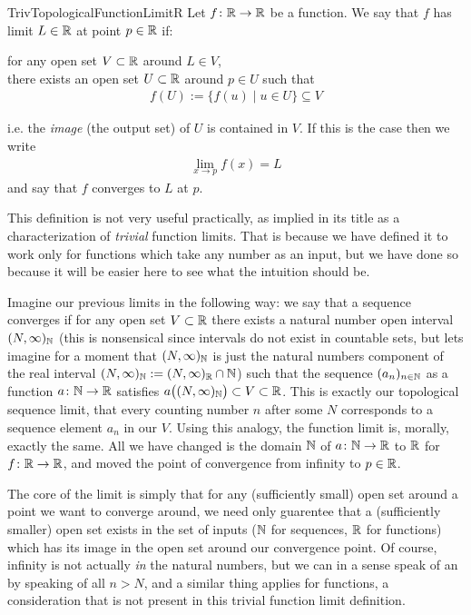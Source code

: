 \documentclass[11pt]{article}
\begin{document}
\begin{label definition}{TrivTopologicalFunctionLimitR}
Let $f\colon \mathbb{R} \to \mathbb{R}$ be a function. We say that $f$ has limit $L \in \mathbb{R}$ at point $p\in \mathbb{R}$ if:

\begin{center}
for any open set $V \subset \mathbb{R}$ around $L \in V$,\\
there exists an open set $U \subset \mathbb{R}$ around $p \in U$ such that \begin{gather*}
f(U) := \{f(u) \mid u \in U\} \subseteq V
\end{gather*}
\end{center}
i.e. the \emph{image} (the output set) of $U$ is contained in $V$. If this is the case then we write \begin{gather*}
\lim_{x \to p} f(x) = L
\end{gather*}
and say that $f$ converges to $L$ at $p$.
\end{label definition}

This definition is not very useful practically, as implied in its title as a characterization of \emph{trivial} function limits. That is because we have defined it to work only for functions which take any number as an input, but we have done so because it will be easier here to see what the intuition should be.

Imagine our previous limits in the following way: we say that a sequence converges if for any open set $V \subset \mathbb{R}$ there exists a natural number open interval $(N,\infty)_{\mathbb{N}}$ (this is nonsensical since intervals do not exist in countable sets, but lets imagine for a moment that $(N,\infty)_{\mathbb{N}}$ is just the natural numbers component of the real interval $(N,\infty)_{\mathbb{N}} := (N,\infty)_{\mathbb{R}} \cap \mathbb{N}$) such that the sequence $(a_n)_{n\in \mathbb{N}}$ as a function $a\colon \mathbb{N} \to \mathbb{R}$ satisfies $a\big((N,\infty)_{\mathbb{N}}\big) \subset V \subset \mathbb{R}$. This is exactly our topological sequence limit, that every counting number $n$ after some $N$ corresponds to a sequence element $a_n$ in our $V$. Using this analogy, the function limit is, morally, exactly the same. All we have changed is the domain $\mathbb{N}$ of $a\colon \mathbb{N} \to \mathbb{R}$ to $\mathbb{R}$ for $f\colon \mathbb{R} \to \mathbb{R}$, and moved the point of convergence from infinity to $p\in \mathbb{R}$.

The core of the limit is simply that for any (sufficiently small) open set around a point we want to converge around, we need only guarentee that a (sufficiently smaller) open set exists in the set of inputs ($\mathbb{N}$ for sequences, $\mathbb{R}$ for functions) which has its image in the open set around our convergence point. Of course, infinity is not actually \emph{in} the natural numbers, but we can in a sense speak of an  by speaking of all $n > N$, and a similar thing applies for functions, a consideration that is not present in this trivial function limit definition.
\end{document}
